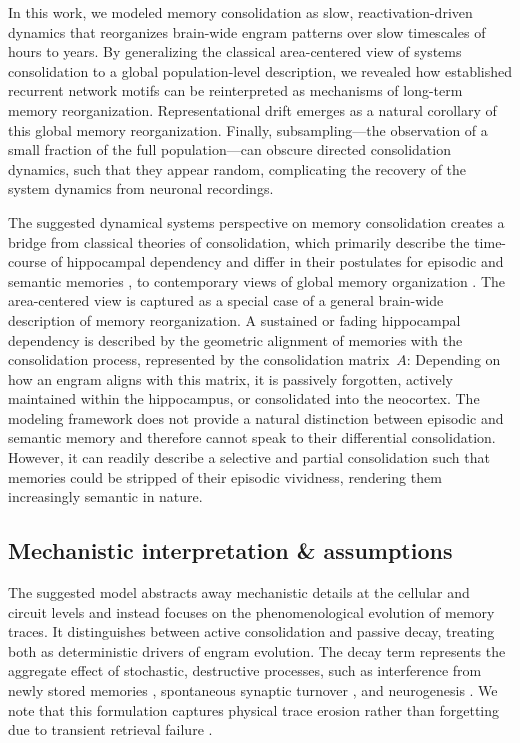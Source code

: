In this work, we modeled memory consolidation as slow, reactivation-driven dynamics that reorganizes brain-wide engram patterns over slow timescales of hours to years. By generalizing the classical area-centered view of systems consolidation to a global population-level description, we revealed how established recurrent network motifs can be reinterpreted as mechanisms of long-term memory reorganization.
Representational drift emerges as a natural corollary of this global memory reorganization. Finally, subsampling---the observation of a small fraction of the full population---can obscure directed consolidation dynamics, such that they appear random, complicating the recovery of the system dynamics from neuronal recordings. 

The suggested dynamical systems perspective on memory consolidation creates a bridge from classical theories of consolidation, which primarily describe the time-course of hippocampal dependency and differ in their postulates for episodic and semantic memories \citep{Squire1995,Nadel1997,Winocur2010}, to contemporary views of global memory organization \citep{Moscovitch2022}. The area-centered view is captured as a special case of a general brain-wide description of memory reorganization. A sustained or fading hippocampal dependency is described by the geometric alignment of memories with the consolidation process, represented by the consolidation matrix~$A$: Depending on how an engram aligns with this matrix, it is passively forgotten, actively maintained within the hippocampus, or consolidated into the neocortex. The modeling framework does not provide a natural distinction between episodic and semantic memory and therefore cannot speak to their differential consolidation. However, it can readily describe a selective and partial consolidation such that memories could be stripped of their episodic vividness, rendering them increasingly semantic in nature. 

\subsection{Mechanistic interpretation \& assumptions}

The suggested model abstracts away mechanistic details at the cellular and circuit levels and instead focuses on the phenomenological evolution of memory traces. It distinguishes between active consolidation and passive decay, treating both as deterministic drivers of engram evolution. 
The decay term represents the aggregate effect of stochastic, destructive processes, such as interference from newly stored memories \citep{Robertson2012}, spontaneous synaptic turnover \citep{Ziv2018}, and neurogenesis \citep{Golbabaei2025a}. We note that this formulation captures physical trace erosion rather than forgetting due to transient retrieval failure \citep{deSnoo2025}.

